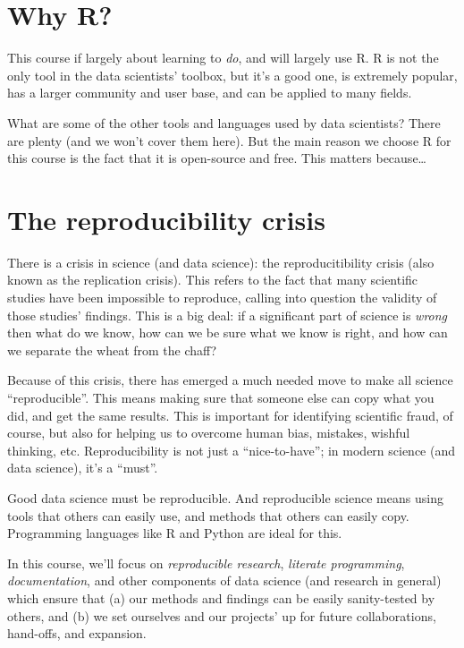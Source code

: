 \documentclass[
]{book}
\begin{document}
\hypertarget{why-r}{%
\section*{Why R?}\label{why-r}}

This course if largely about learning to \emph{do}, and will largely use R. R is not the only tool in the data scientists' toolbox, but it's a good one, is extremely popular, has a larger community and user base, and can be applied to many fields.

What are some of the other tools and languages used by data scientists? There are plenty (and we won't cover them here). But the main reason we choose R for this course is the fact that it is open-source and free. This matters because\ldots{}

\hypertarget{the-reproducibility-crisis}{%
\section*{The reproducibility crisis}\label{the-reproducibility-crisis}}

There is a crisis in science (and data science): the reproducitibility crisis (also known as the replication crisis). This refers to the fact that many scientific studies have been impossible to reproduce, calling into question the validity of those studies' findings. This is a big deal: if a significant part of science is \emph{wrong} then what do we know, how can we be sure what we know is right, and how can we separate the wheat from the chaff?

Because of this crisis, there has emerged a much needed move to make all science ``reproducible''. This means making sure that someone else can copy what you did, and get the same results. This is important for identifying scientific fraud, of course, but also for helping us to overcome human bias, mistakes, wishful thinking, etc. Reproducibility is not just a ``nice-to-have''; in modern science (and data science), it's a ``must''.

Good data science must be reproducible. And reproducible science means using tools that others can easily use, and methods that others can easily copy. Programming languages like R and Python are ideal for this.

In this course, we'll focus on \emph{reproducible research}, \emph{literate programming}, \emph{documentation}, and other components of data science (and research in general) which ensure that (a) our methods and findings can be easily sanity-tested by others, and (b) we set ourselves and our projects' up for future collaborations, hand-offs, and expansion.
\end{document}
